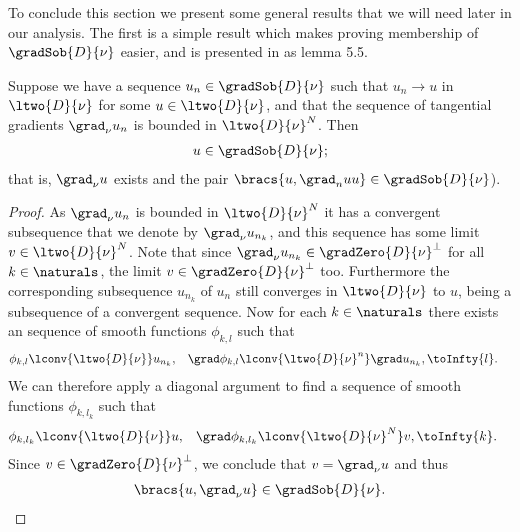 To conclude this section we present some general results that we will need later in our analysis.
The first is a simple result which makes proving membership of $\gradSob{D}{\nu}$ easier, and is presented in \cite{zhikov2002homogenization} as lemma 5.5.
\begin{prop} \label{prop:Lemma5-5}
	Suppose we have a sequence $u_n\in\gradSob{D}{\nu}$ such that $u_n\rightarrow u$ in $\ltwo{D}{\nu}$ for some $u\in\ltwo{D}{\nu}$, and that the sequence of tangential gradients $\grad_\nu u_n$ is bounded in $\ltwo{D}{\nu}^N$.
	Then 
	\begin{align*}
		u\in\gradSob{D}{\nu};
	\end{align*}
	that is, $\grad_\nu u$ exists and the pair $\bracs{u,\grad_nu u}\in\gradSob{D}{\nu}$).
\end{prop}
\begin{proof}
	As $\grad_\nu u_n$ is bounded in $\ltwo{D}{\nu}^N$ it has a convergent subsequence that we denote by $\grad_\nu u_{n_k}$, and this sequence has some limit $v\in\ltwo{D}{\nu}^N$.
	Note that since $\grad_\nu u_{n_k}\in\gradZero{D}{\nu}^\perp$ for all $k\in\naturals$, the limit $v\in\gradZero{D}{\nu}^\perp$ too.
	Furthermore the corresponding subsequence $u_{n_k}$ of $u_n$ still converges in $\ltwo{D}{\nu}$ to $u$, being a subsequence of a convergent sequence.
	Now for each $k\in\naturals$ there exists an sequence of smooth functions $\phi_{k,l}$ such that
	\begin{align*}
		\phi_{k,l}\lconv{\ltwo{D}{\nu}} u_{n_k}, &\quad \grad\phi_{k,l}\lconv{\ltwo{D}{\nu}^n}\grad u_{n_k}, \toInfty{l}.
	\end{align*}
	We can therefore apply a diagonal argument to find a sequence of smooth functions $\phi_{k, l_k}$ such that
	\begin{align*}
		\phi_{k,l_k}\lconv{\ltwo{D}{\nu}} u, &\quad \grad\phi_{k,l_k}\lconv{\ltwo{D}{\nu}^N}v, \toInfty{k}.
	\end{align*}
	Since $v\in\gradZero{D}{\nu}^\perp$, we conclude that $v = \grad_\nu u$ and thus
	\begin{align*}
		\bracs{u, \grad_\nu u}\in \gradSob{D}{\nu}.
	\end{align*}
\end{proof}

